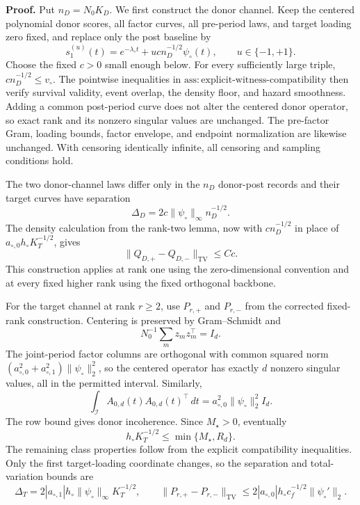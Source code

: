 \textbf{Proof.}
Put \(n_D=N_0K_D\).  We first construct the donor channel.  Keep the centered polynomial donor scores, all factor curves, all pre-period laws, and target loading zero fixed, and replace only the post baseline by
\[
 s_1^{(u)}(t)=e^{-\lambda_\circ t}+ucn_D^{-1/2}\psi_\circ(t),\qquad u\in\{-1,+1\}.
\]
Choose the fixed \(c>0\) small enough below.  For every sufficiently large triple, \(cn_D^{-1/2}\le v_\circ\).  The pointwise inequalities in \(\mathrm{ass:explicit\mbox{-}witness\mbox{-}compatibility}\) then verify survival validity, event overlap, the density floor, and hazard smoothness.  Adding a common post-period curve does not alter the centered donor operator, so exact rank and its nonzero singular values are unchanged.  The pre-factor Gram, loading bounds, factor envelope, and endpoint normalization are likewise unchanged.  With censoring identically infinite, all censoring and sampling conditions hold.

The two donor-channel laws differ only in the \(n_D\) donor-post records and their target curves have separation
\[
 \Delta_D=2c\|\psi_\circ\|_\infty n_D^{-1/2}.
\]
The density calculation from the rank-two lemma, now with \(c n_D^{-1/2}\) in place of \(a_{\circ,0}h_\circ K_T^{-1/2}\), gives
\[
 \|Q_{D,+}-Q_{D,-}\|_{\mathrm{TV}}\le Cc.
\]
This construction applies at rank one using the zero-dimensional convention and at every fixed higher rank using the fixed orthogonal backbone.

For the target channel at rank \(r\ge2\), use \(P_{r,+}\) and \(P_{r,-}\) from the corrected fixed-rank construction.  Centering is preserved by Gram--Schmidt and
\[
 N_0^{-1}\sum_mz_mz_m^\top=I_d.
\]
The joint-period factor columns are orthogonal with common squared norm \((a_{\circ,0}^2+a_{\circ,1}^2)\|\psi_\circ\|_2^2\), so the centered operator has exactly \(d\) nonzero singular values, all in the permitted interval.  Similarly,
\[
 \int_{\mathcal I}A_{0,d}(t)A_{0,d}(t)^\top\,dt
 =a_{\circ,0}^2\|\psi_\circ\|_2^2I_d.
\]
The row bound gives donor incoherence.  Since \(M_\star>0\), eventually
\[
 h_\circ K_T^{-1/2}\le\min\{M_\star,R_d\}.
\]
The remaining class properties follow from the explicit compatibility inequalities.  Only the first target-loading coordinate changes, so the separation and total-variation bounds are
\[
 \Delta_T=2|a_{\circ,1}|h_\circ\|\psi_\circ\|_\infty K_T^{-1/2},
 \qquad
 \|P_{r,+}-P_{r,-}\|_{\mathrm{TV}}
 \le2|a_{\circ,0}|h_\circ c_f^{-1/2}\|\psi_\circ'\|_2.
\]


